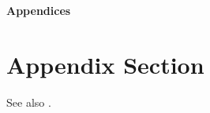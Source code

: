 \begin{center}{\Large\textbf{Appendices}}\end{center}
\section{Appendix Section}

\lipsum[1-2] See also \citet{boppart2018exploiting}.

\newpage
\printbibliography[title=Appendix References,heading=subbibintoc,filter=appendixOnlyFilter]
